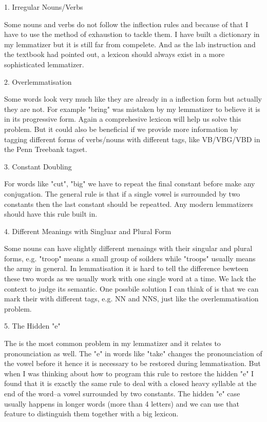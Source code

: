 \documentclass[11pt]{article} %
\begin{document}
1. Irregular Nouns/Verbs

Some nouns and verbs do not follow the inflection rules and because of that I have to use the method of exhaustion to tackle them. I have built a dictionary in my lemmatizer but it is still far from compelete. And as the lab instruction  and the textbook had pointed out\cite[55]{JurafskyMartin200805}, a lexicon should always exist in a more sophisticated lemmatizer.

2. Overlemmatisation

Some words look very much like they are already in a inflection form but actually they are not. For example "bring" was mistaken by my lemmatizer to believe it is in its progressive form. Again a comprehesive lexicon will help us solve this problem. But it could also be beneficial if we provide more information by tagging different forms of verbs/nouns with different tags, like VB/VBG/VBD in the Penn Treebank tagset.

3. Constant Doubling

For words like "cut", "big" we have to repeat the final constant before make any conjugation. The general rule is that if a single vowel is surrounded by two constants then the last constant should be repeatted. Any modern lemmatizers should have this rule built in.

4. Different Meanings with Singluar and Plural Form

Some nouns can have slightly different menaings with their singular and plural forms, e.g. "troop" means a small group of soilders while "troops" usually means the army in general. In lemmatisation it is hard to tell the difference bewteen these two words as we usually work with one single word at a time. We lack the context to judge its semantic. One possbile solution I can think of is that we can mark their with different tags, e.g. NN and NNS, just like the overlemmatisation problem.

5. The Hidden "e"

The is the most common problem in my lemmatizer and it relates to pronounciation as well. The "e" in words like "take" changes the pronounciation of the vowel before it hence it is necessary to be restored during lemmatisation. But when I was thinking about how to program this rule to restore the hidden "e" I found that it is exactly the same rule to deal with a closed heavy syllable at the end of the word--a vowel surrounded by two constants. The hidden "e" case usually happens in longer words (more than 4 letters) and we can use that feature to distinguish them together with a big lexicon.
\end{document}
